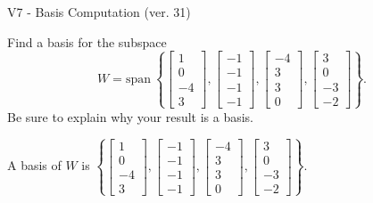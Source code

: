 \begin{exercise}
  \begin{exerciseTitle}V7 - Basis Computation (ver. 31)\end{exerciseTitle}
  \begin{exerciseStatement}
    Find a basis for the subspace 
\[W=\mathrm{span}\ \left\{\left[\begin{array}{r}
1 \\
0 \\
-4 \\
3
\end{array}\right] , \left[\begin{array}{r}
-1 \\
-1 \\
-1 \\
-1
\end{array}\right] , \left[\begin{array}{r}
-4 \\
3 \\
3 \\
0
\end{array}\right] , \left[\begin{array}{r}
3 \\
0 \\
-3 \\
-2
\end{array}\right]\right\}.\]
 Be sure to explain why your result is a basis.


  \end{exerciseStatement}
  \begin{exerciseAnswer}
   A basis of \(W\) is  \(\left\{\left[\begin{array}{r}
1 \\
0 \\
-4 \\
3
\end{array}\right] , \left[\begin{array}{r}
-1 \\
-1 \\
-1 \\
-1
\end{array}\right] , \left[\begin{array}{r}
-4 \\
3 \\
3 \\
0
\end{array}\right] , \left[\begin{array}{r}
3 \\
0 \\
-3 \\
-2
\end{array}\right]\right\}\).
  


  \end{exerciseAnswer}
\end{exercise}
